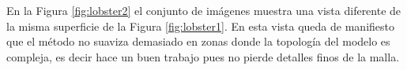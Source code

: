 En la Figura \ref{fig:lobster2} el conjunto de imágenes muestra una vista diferente de la misma superficie de la Figura \ref{fig:lobster1}. En esta vista queda de manifiesto que el método no suaviza demasiado en zonas donde la topología del modelo es compleja, es decir hace un buen trabajo pues no pierde detalles finos de la malla.

\begin{figure}[htp]
  \begin{center}

\end{center}
\end{figure}

